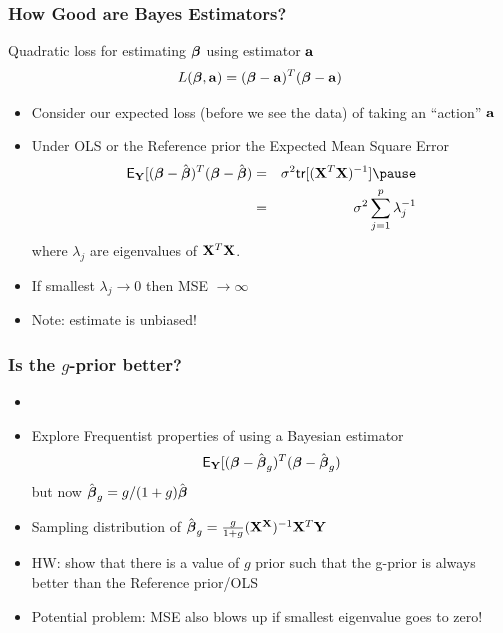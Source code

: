 \documentclass[]{beamer}\usepackage[]{graphicx}\usepackage[]{color}
\begin{document}
\begin{frame}
  \frametitle{How Good are Bayes Estimators?}
Quadratic loss for estimating  $\boldsymbol{\beta}$ using estimator $\mathbf{a}$
$$ L(\boldsymbol{\beta}, \mathbf{a}) =  ( \boldsymbol{\beta} - \mathbf{a})^T(\boldsymbol{\beta} -\mathbf{a})$$ \pause

\begin{itemize}
\item Consider our expected loss (before we see the data) of taking an
``action'' $\mathbf{a}$ \pause
\item Under OLS or the  Reference prior the Expected Mean Square Error  \pause
  \begin{eqnarray*}
\E_\Y[( \b - \bhat)^T(\b -\bhat) & = &\sigma^2
  \tr[(\X^T\X)^{-1}] \pause \\
 & = & \sigma^2 \sum_{j=1}^p \lambda_j^{-1}
  \end{eqnarray*}
where $\lambda_j$ are eigenvalues of $\mathbf{X}^T\mathbf{X}$.
\pause
\item If smallest $\lambda_j \to 0$ then MSE  $\to \infty$
\item Note: estimate is unbiased!
\end{itemize}
\end{frame}

\begin{frame}
  \frametitle{Is the $g$-prior better?}

\begin{itemize}
  \item

\item Explore Frequentist properties of using a Bayesian estimator
$$\textsf{E}_{\mathbf{Y}}[( \boldsymbol{\beta} - \hat{\boldsymbol{\beta}}_g)^T(\boldsymbol{\beta} -\hat{\boldsymbol{\beta}}_g)$$
but now $\hat{\boldsymbol{\beta}}_g = g/(1+g) \hat{\boldsymbol{\beta}}$  \pause

\item Sampling distribution of $\hat{\boldsymbol{\beta}}_g  = \frac{g}{1+g}(\mathbf{X}^{\mathbf{X}})^{-1} \mathbf{X}^T\mathbf{Y}$  \pause
\item HW: show that there is a value of $g$ prior such that the g-prior is always better than the Reference prior/OLS

\item Potential problem: MSE also blows up if smallest eigenvalue goes to zero!
\end{itemize}
\end{frame}
\end{document}

